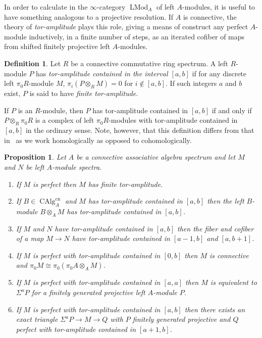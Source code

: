 \documentclass{article}
\newtheorem{proposition}{Proposition}[subsection]
\theoremstyle{definition}
\newtheorem{definition}{Definition}[subsection]
\renewcommand{\i}{\infty}
\DeclareMathOperator{\LMod}{LMod}
\DeclareMathOperator{\CAlg}{CAlg}
\newcommand{\cn}{\mathrm{cn}}
\begin{document}
In order to calculate in the $\i$-category $\LMod_A$ of left $A$-modules, it is useful to have something analogous to a projective resolution.
If $A$ is connective, the theory of {\em tor-amplitude} plays this role, giving a means of construct any perfect $A$-module inductively, in a finite number of steps, as an iterated cofiber of maps from shifted finitely projective left $A$-modules.






\begin{definition}
Let $R$ be a connective commutative ring spectrum.
A left  $R$-module   $P$   has   {\em tor-amplitude   contained   in   the   interval   $[a,b]$} if  for  any  discrete left $\pi_0  R$-module  $M$, $\pi_i(P\otimes_R M)=0$ for $i\notin [a,b]$. If such integers $a$ and $b$ exist,  $P$ is said to have {\em finite tor-amplitude}.
\end{definition}

If $P$ is an $R$-module, then $P$ has tor-amplitude contained in $[a,b]$ if and only if $P\otimes_R \pi_0
R$  is  a  complex  of  left $\pi_0  R$-modules  with  tor-amplitude  contained  in  $[a,b]$ in
the ordinary sense. Note, however, that this definition  differs  from  that
in~\cite[I  5.2]{SGA6}  as  we  work homologically as opposed to cohomologically.



\begin{proposition}{\em \cite[Proposition 2.13]{AG14}}\label{prop:tor}
Let $A$ be a connective associative algebra spectrum and let $M$ and $N$ be left $A$-module spectra.
\begin{enumerate}
\itemsep.1em
\item[\em{(1)}]  If  $M$  is   perfect  then $M$   has   finite   tor-amplitude.
\item[\em{(2)}]   If $B\in\CAlg_A^{\cn}$ and $M$ has tor-amplitude contained in $[a,b]$ then the left $B$-module $B\otimes_A M$ has tor-amplitude contained in $[a,b]$.
\item[\em{(3)}]  If $M$ and $N$ have tor-amplitude contained in $[a,b]$ then the fiber and cofiber of a map $M\to N$ have tor-amplitude contained in $[a-1,b]$ and $[a,b+1]$.
\item[\em{(4)}]   If $M$ is perfect  with tor-amplitude contained in $[0,b]$ then $M$ is connective and $\pi_0   M\cong\pi_0(\pi_0 A\otimes_A M)$.
\item[\em{(5)}] If $M$ is  perfect  with  tor-amplitude  contained  in  $[a,a]$ then $M$ is equivalent to $\Sigma^{a}P$ for a finitely generated projective left $A$-module $P$.
\item[\em{(6)}]   If $M$ is perfect with tor-amplitude contained in $[a,b]$ then there exists an exact triangle $\Sigma^a P\rightarrow M\to Q$ with $P$ finitely generated projective and $Q$ perfect with tor-amplitude contained in $[a+1,b]$.
\end{enumerate}
\end{proposition}
\end{document}
